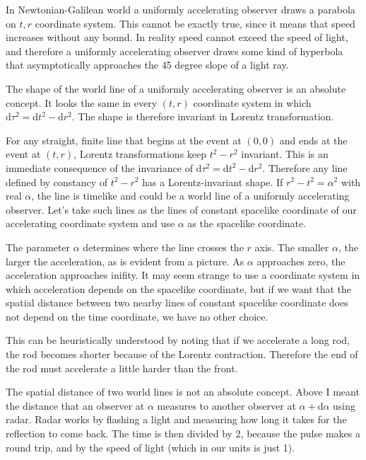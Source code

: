 \documentclass[11pt,oneside%
]{memoir}
\newcommand{\dd}{\mathrm{d}}
\begin{document}

In Newtonian-Galilean world a uniformly accelerating observer draws a parabola on \(t,r\) coordinate system. This cannot be exactly true, since it means that speed increases without any bound. In reality speed cannot exceed the speed of light, and therefore a uniformly accelerating observer draws some kind of hyperbola that asymptotically approaches the 45 degree slope of a light ray.


The shape of the world line of a uniformly accelerating observer is an absolute concept. It looks the same in every \((t,r)\) coordinate system in which \(\dd\tau^2=\dd t^2-\dd r^2\). The shape is therefore invariant in Lorentz transformation.

For any straight, finite line that begins at the event at \((0,0)\) and ends at the event at \((t,r)\), Lorentz transformations keep \(t^2-r^2\) invariant. This is an immediate consequence of the invariance of \(\dd\tau^2=\dd t^2-\dd r^2\). Therefore any line defined by constancy of \(t^2-r^2\) has a Lorentz-invariant shape. If \(r^2-t^2=\alpha^2\) with real \(\alpha\), the line is timelike and could be a world line of a uniformly accelerating observer. Let's take such lines as the lines of constant spacelike coordinate of our accelerating coordinate system and use \(\alpha\) as the spacelike coordinate.

The parameter \(\alpha\) determines where the line crosses the \(r\) axis. The smaller \(\alpha\), the larger the acceleration, as is evident from a picture. As \(\alpha\) approaches zero, the acceleration approaches inifity. It may seem strange to use a coordinate system in which acceleration depends on the spacelike coordinate, but if we want that the spatial distance between two nearby lines of constant spacelike coordinate does not depend on the time coordinate, we have no other choice.

This can be heuristically understood by noting that if we accelerate a long rod, the rod becomes shorter because of the Lorentz contraction. Therefore the end of the rod must accelerate a little harder than the front. 

The spatial distance of two world lines is not an absolute concept. Above I meant the distance that an observer at \(\alpha\) measures to another observer at \(\alpha+\dd\alpha\) using radar. Radar works by flashing a light and measuring how long it takes for the reflection to come back. The time is then divided by 2, because the pulse makes a round trip, and by the speed of light (which in our units is just 1).
\end{document}
